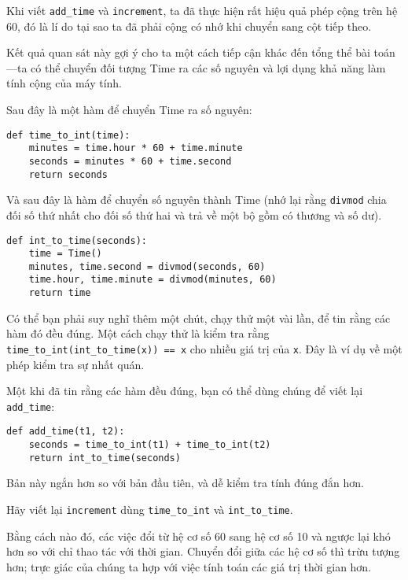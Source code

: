 \documentclass[11pt]{book}
\begin{document}

Khi viết \verb"add_time" và {\tt increment}, ta đã thực hiện rất hiệu quả
phép cộng trên hệ 60, đó là lí do tại sao ta đã phải cộng có nhớ
khi chuyển sang cột tiếp theo.


Kết quả quan sát này gợi ý cho ta một cách tiếp cận khác đến tổng thể
bài toán---ta có thể chuyển đối tượng Time ra các số nguyên và lợi dụng
khả năng làm tính cộng của máy tính.

Sau đây là một hàm để chuyển Time ra số nguyên:

\beforeverb
\begin{verbatim}
def time_to_int(time):
    minutes = time.hour * 60 + time.minute
    seconds = minutes * 60 + time.second
    return seconds
\end{verbatim}
\afterverb
%
Và sau đây là hàm để chuyển số nguyên thành Time
(nhớ lại rằng {\tt divmod} chia đối số thứ nhất cho
đối số thứ hai và trả về một bộ gồm có thương và số dư).


\beforeverb
\begin{verbatim}
def int_to_time(seconds):
    time = Time()
    minutes, time.second = divmod(seconds, 60)
    time.hour, time.minute = divmod(minutes, 60)
    return time
\end{verbatim}
\afterverb
%
Có thể bạn phải suy nghĩ thêm một chút, chạy thử một vài lần,
để tin rằng các hàm đó đều đúng. Một cách chạy thử là 
kiểm tra rằng \verb"time_to_int(int_to_time(x)) == x" cho nhiều giá trị
của {\tt x}. Đây là ví dụ về một phép kiểm tra sự nhất quán.


Một khi đã tin rằng các hàm  đều đúng, bạn có thể dùng chúng
để viết lại \verb"add_time":

\beforeverb
\begin{verbatim}
def add_time(t1, t2):
    seconds = time_to_int(t1) + time_to_int(t2)
    return int_to_time(seconds)
\end{verbatim}
\afterverb
%
Bản này ngắn hơn so với bản đầu tiên, và dễ kiểm tra tính đúng đắn hơn.

\begin{ex}
Hãy viết lại {\tt increment} dùng \verb"time_to_int" và \verb"int_to_time".
\end{ex}

Bằng cách nào đó, các việc đổi từ hệ cơ số 60 sang hệ cơ số 10 và ngược lại
khó hơn so với chỉ thao tác với thời gian. Chuyển đổi giữa các hệ cơ số thì
trừu tượng hơn; trực giác của chúng ta hợp với việc tính toán các giá trị
thời gian hơn.
\end{document}
